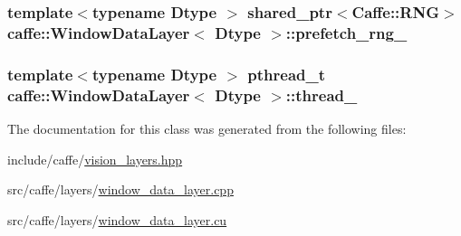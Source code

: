 \hypertarget{classcaffe_1_1_window_data_layer_afa989509237083d73a6e77935883587b}{
\subsubsection[{prefetch\+\_\+rng\+\_\+}]{\setlength{\rightskip}{0pt plus 5cm}template$<$typename Dtype $>$ shared\+\_\+ptr$<${\bf Caffe\+::\+R\+N\+G}$>$ {\bf caffe\+::\+Window\+Data\+Layer}$<$ Dtype $>$\+::prefetch\+\_\+rng\+\_\+\hspace{0.3cm}{\ttfamily [protected]}}}\label{classcaffe_1_1_window_data_layer_afa989509237083d73a6e77935883587b}
\hypertarget{classcaffe_1_1_window_data_layer_aeea55aee8772811aeaa7e0e850544002}{
\subsubsection[{thread\+\_\+}]{\setlength{\rightskip}{0pt plus 5cm}template$<$typename Dtype $>$ pthread\+\_\+t {\bf caffe\+::\+Window\+Data\+Layer}$<$ Dtype $>$\+::thread\+\_\+\hspace{0.3cm}{\ttfamily [protected]}}}\label{classcaffe_1_1_window_data_layer_aeea55aee8772811aeaa7e0e850544002}


The documentation for this class was generated from the following files\+:\begin{DoxyCompactItemize}
\item 
include/caffe/\hyperlink{vision__layers_8hpp}{vision\+\_\+layers.\+hpp}\item 
src/caffe/layers/\hyperlink{window__data__layer_8cpp}{window\+\_\+data\+\_\+layer.\+cpp}\item 
src/caffe/layers/\hyperlink{window__data__layer_8cu}{window\+\_\+data\+\_\+layer.\+cu}\end{DoxyCompactItemize}
